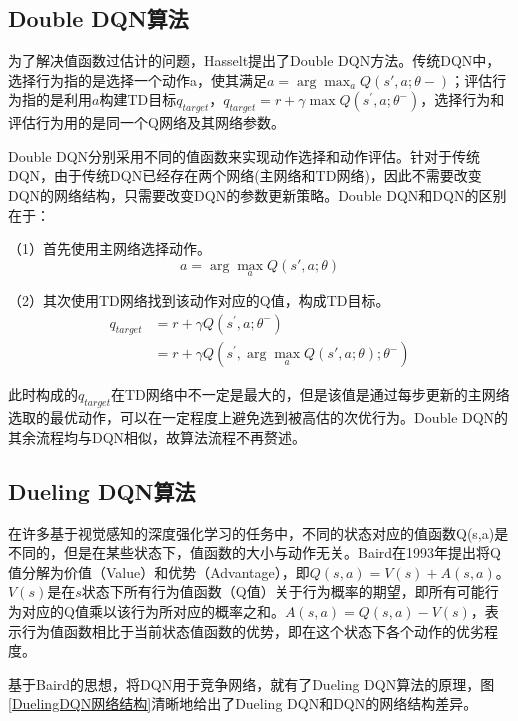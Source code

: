 \subsection{Double DQN算法}%

为了解决值函数过估计的问题，Hasselt提出了Double DQN方法\cite{2015DDQN}。传统DQN中，选择行为指的是选择一个动作a，使其满足$a = \arg \max_a Q(s',a; \theta{-})$；评估行为指的是利用$a$构建TD目标$q_{target}$，$q_{target} = r + \gamma \max Q(s^{'},a; \theta^{-})$，选择行为和评估行为用的是同一个Q网络及其网络参数。

Double DQN分别采用不同的值函数来实现动作选择和动作评估。针对于传统DQN，由于传统DQN已经存在两个网络(主网络和TD网络)，因此不需要改变DQN的网络结构，只需要改变DQN的参数更新策略。Double DQN和DQN的区别在于：

（1）首先使用主网络选择动作。
\begin{equation*}
    a = \arg \max_a Q(s',a; \theta)
\end{equation*}

（2）其次使用TD网络找到该动作对应的Q值，构成TD目标。
\begin{equation*}
    \begin{aligned}
        q_{target} &= r + \gamma Q(s^{'}, a; \theta^{-})\\
                  &= r + \gamma Q(s^{'}, \arg \max_a Q(s',a; \theta); \theta^{-})
    \end{aligned}
\end{equation*}

此时构成的$q_{target}$在TD网络中不一定是最大的，但是该值是通过每步更新的主网络选取的最优动作，可以在一定程度上避免选到被高估的次优行为。Double DQN的其余流程均与DQN相似，故算法流程不再赘述。

\subsection{Dueling DQN算法}%

在许多基于视觉感知的深度强化学习的任务中，不同的状态对应的值函数Q(s,a)是不同的，但是在某些状态下，值函数的大小与动作无关。Baird在1993年提出将Q值分解为价值（Value）和优势（Advantage）\cite{1993Advantage}，即$Q(s,a) = V(s) + A(s,a)$。$V(s)$是在$s$状态下所有行为值函数（Q值）关于行为概率的期望，即所有可能行为对应的Q值乘以该行为所对应的概率之和。$A(s,a)=Q(s,a)-V(s)$，表示行为值函数相比于当前状态值函数的优势，即在这个状态下各个动作的优劣程度。

基于Baird的思想，将DQN用于竞争网络，就有了Dueling DQN算法的原理，图\ref{DuelingDQN网络结构}清晰地给出了Dueling DQN和DQN的网络结构差异。

